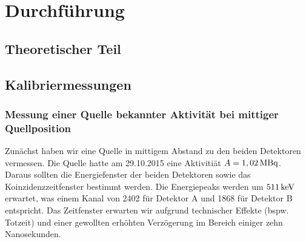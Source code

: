 \section{Durchführung}
\subsection{Theoretischer Teil}

\subsection{Kalibriermessungen}
    \subsubsection{Messung einer Quelle bekannter Aktivität bei mittiger Quellposition}
       Zunächst haben wir eine Quelle in mittigem Abstand zu den beiden Detektoren vermessen. Die Quelle hatte am 29.10.2015 eine Aktivitiät $A = \unit[1,02]{MBq}$.\\
       Daraus sollten die Energiefenster der beiden Detektoren sowie das Koinzidenzzeitfenster bestimmt werden. Die Energiepeaks werden um $\unit[511]{keV}$ erwartet, was einem
       Kanal von 2402 für Detektor A und 1868 für Detektor B entspricht. Das Zeitfenster erwarten wir aufgrund technischer Effekte (bspw. Totzeit) und einer gewollten
       erhöhten Verzögerung im Bereich einiger zehn Nanosekunden.  
       \vspace{2mm}
        
